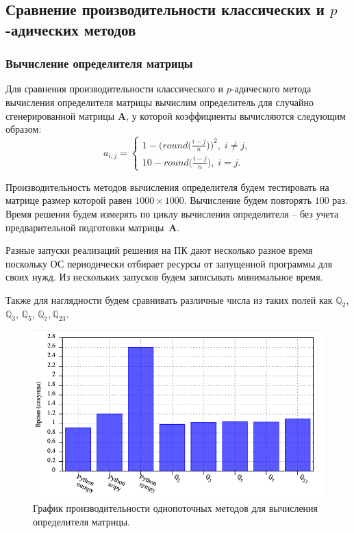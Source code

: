 \documentclass[master, och, diploma, times]{sty/SCWorks}
\theoremstyle{plain}
\theoremstyle{definition}
\numberwithin{equation}{section}
\begin{document}
\subsection{Сравнение производительности классических и $p$-адических \mbox{методов}}

\subsubsection{Вычисление определителя матрицы}

Для сравнения производительности классического и $p$-адического метода вычисления определителя матрицы вычислим определитель для случайно сгенерированной матрицы $\boldsymbol{A}$, у которой коэффициенты вычисляются следующим образом:
\begin{equation}
a_{i,j}= 
\begin{cases} 
1-\bigg(round\bigg(\frac{i-j}{n}\bigg)\bigg)^2, \; i \neq j, \\ 
10-round\bigg(\frac{i-j}{n}\bigg), \; i = j.
\end{cases}
\end{equation}

Производительность методов вычисления определителя будем \mbox{тестировать} на матрице размер которой равен $1000 \times 1000$. Вычисление будем повторять $100$ раз. Время решения будем измерять по циклу вычисления определителя – без учета предварительной подготовки \mbox{матрицы $\boldsymbol{A}$}.

Разные запуски реализаций решения на ПК дают несколько разное время поскольку ОС периодически отбирает ресурсы от запущенной программы для своих нужд. Из нескольких запусков будем записывать минимальное время.

Также для наглядности будем сравнивать различные числа из таких полей как $\mathbb{Q}_2$, $\mathbb{Q}_3$, $\mathbb{Q}_5$, $\mathbb{Q}_7, \mathbb{Q}_{23}$.

\begin{figure}[H]
\centerline{\includegraphics[width=0.85\linewidth]{../gnuplot/single/det/plot.png}}
\caption{График производительности однопоточных методов для вычисления определителя матрицы.}
\label{img:single:det:1}
\end{figure}
\end{document}
